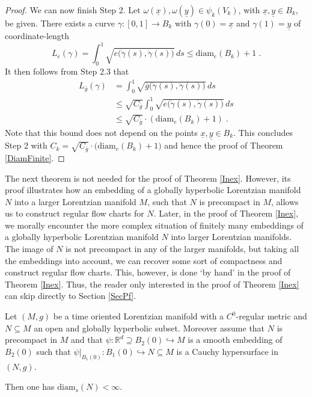 \documentclass[reqno]{article}
\newcommand{\R}{\mathbb{R}}
\newcommand{\diam}{\mathrm{diam}}
\newcommand{\ux}{\underline{x}}
\begin{document}
\begin{proof}
We can now finish Step 2. Let $\omega(\ux), \omega(\underline{y}) \in \psi_k(V_k)$, with $\ux, \underline{y} \in B_k$, be given. There exists a curve $\gamma : [0,1] \to B_k$ with $\gamma(0) = \ux$ and $\gamma(1) = \underline{y}$ of coordinate-length 
\begin{equation*}
L_e(\gamma) = \int_0^1 \sqrt{e\big(\dot{\gamma}(s), \dot{\gamma}(s)\big)} \, ds \leq \diam_e(B_k) + 1 \;.
\end{equation*}
It then follows from Step 2.3 that 
\begin{equation*}
\begin{split}
L_{\overline{g}}(\gamma) &= \int_0^1 \sqrt{\overline{g}\big( \dot{\gamma}(s), \dot{\gamma}(s)\big)} \, ds \\
&\leq \sqrt{C_{\overline{g}}} \int_0^1 \sqrt{e\big( \dot{\gamma}(s), \dot{\gamma}(s)\big)} \, ds \\
&\leq \sqrt{C_{\overline{g}}} \cdot (\diam_e(B_k) + 1) \;.
\end{split}
\end{equation*}
Note that this bound does not depend on the points $\ux, \underline{y} \in B_k$. 
This concludes Step 2 with $C_k = \sqrt{C_{\overline{g}}} \cdot \big(\diam_e(B_k) + 1\big)$ and hence the proof of Theorem \ref{DiamFinite}.
\end{proof}

The next theorem is not needed for the proof of Theorem \ref{Inex}. However, its proof illustrates how an embedding of a globally hyperbolic Lorentzian manifold $N$ into a larger Lorentzian manifold $M$, such that $N$ is precompact in $M$, allows us to construct regular flow charts for $N$. Later, in the proof of Theorem \ref{Inex}, we morally encounter the more complex situation of finitely many embeddings of a globally hyperbolic Lorentzian manifold $N$ into larger Lorentzian manifolds. The image of $N$ is not precompact in any of the larger manifolds, but taking all the embeddings into account, we can recover some sort of compactness and construct regular flow charts. This, however, is done `by hand' in the proof of Theorem \ref{Inex}. Thus, the reader only interested in the proof of Theorem \ref{Inex} can skip directly to Section \ref{SecPf}.



\begin{theorem}
Let $(M,g)$ be a time oriented Lorentzian manifold with a $C^0$-regular metric and $N \subseteq M$ an open and globally hyperbolic subset. Moreover assume that $N$ is precompact in $M$ and that $\psi : \R^d \supseteq B_2(0) \hookrightarrow M$ is a smooth embedding of $B_2(0)$ such that $\psi|_{B_1(0)} : B_1(0) \hookrightarrow N \subseteq M$ is a Cauchy hypersurface in $(N,g)$.

Then one has $\diam_s(N) < \infty$.
\end{theorem}
\end{document}
